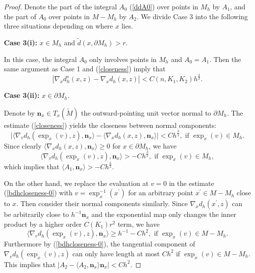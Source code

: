 \documentclass[11pt,letterpaper]{amsart}
\numberwithin{equation}{section}
\theoremstyle{definition}
\theoremstyle{plain}
\theoremstyle{definition}
\theoremstyle{plain}
\theoremstyle{definition}
\theoremstyle{plain}
\begin{document}
\begin{proof}
Denote the part of the integral $A_0$ (\ref{ddA0}) over points in $M_h$ by $A_1$, and the part of $A_0$ over points in $M-M_h$ by $A_2$. We divide Case 3 into the following three situations depending on where $x$ lies.

\smallskip
\textbf{Case 3(i):} $x\in M_h$ and $\widetilde{d}(x,\partial M_h)>r$.

In this case, the integral $A_0$ only involves points in $M_h$ and $A_0=A_1$. Then the same argument as Case 1 and (\ref{closeness}) imply that
\begin{equation*}\label{dhslower}
|\nabla_x d_h^s(x,z)-\nabla_x d_h(x,z)|<C(n,K_1,K_2)h^{\frac{3}{2}}.
\end{equation*}

\textbf{Case 3(ii):} $x\in \partial M_h$.

Denote by $\textbf{n}_x\in T_x (\widetilde{M})$ the outward-pointing unit vector normal to $\partial M_h$. The estimate (\ref{closeness}) yields the closeness between normal components:
$$\big|\langle \nabla_v d_h(\exp_x(v),z),\textbf{n}_x \rangle -\langle \nabla_x d_h(x,z),\textbf{n}_x \rangle \big|< Ch^{\frac{3}{2}}, \textrm{ if }\exp_x(v)\in M_h.$$
Since clearly $\langle \nabla_x d_h(x,z),\textbf{n}_x \rangle\geqslant 0$ for $x\in \partial M_h$, we have 
\begin{equation}\label{smallnormal}
\langle \nabla_v d_h(\exp_x(v),z),\textbf{n}_x \rangle >-Ch^{\frac{3}{2}}, \textrm{ if }\exp_x(v)\in M_h,
\end{equation}
which implies that $\langle A_1,\textbf{n}_x \rangle > -Ch^{\frac{3}{2}}$.

On the other hand, we replace the evaluation at $v=0$ in the estimate (\ref{bdhcloseness-0}) with $v=\exp_x^{-1}(x^{\prime})$ for an arbitrary point $x^{\prime}\in M-M_h$ close to $x$. Then consider their normal components similarly. Since $\nabla_x d_h(x^{\prime},z)$ can be arbitrarily close to $h^{-1}\textbf{n}_x$ and the exponential map only changes the inner product by a higher order $C(K_1)r^2$ term, we have
\begin{equation}\label{largenormal}
\langle \nabla_v d_h(\exp_x(v),z),\textbf{n}_x \rangle \geqslant h^{-1}-Ch^{2}, \textrm{ if }\exp_x(v)\in M-M_h.
\end{equation}
Furthermore by (\ref{bdhcloseness-0}), the tangential component of $\nabla_v d_h(\exp_x(v),z)$ can only have length at most $Ch^{2}$ if $\exp_x(v)\in M-M_h$. This implies that $|A_2-\langle A_2,\textbf{n}_x \rangle \textbf{n}_x|<Ch^{2}$.


\end{proof}
\end{document}
